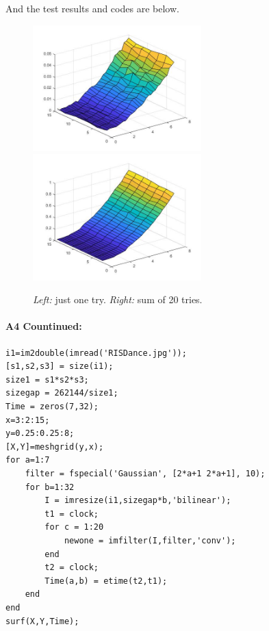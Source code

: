 	And the test results and codes are below.

	\begin{figure}[h]
    \centering
    \includegraphics[width=6.5cm]{hw2_q4_graph1.jpg}
    \includegraphics[width=6.5cm]{hw2_q4_graph3_20try.jpg}
    \caption{\emph{Left:} just one try. \emph{Right:} sum of 20 tries.}
    \label{fig:result3}
\end{figure}


	
	
	
	
	
	\pagebreak
	\paragraph{A4 Countinued:}
\begin{lstlisting}[style=Matlab-editor]
i1=im2double(imread('RISDance.jpg'));
[s1,s2,s3] = size(i1);
size1 = s1*s2*s3; 
sizegap = 262144/size1; 
Time = zeros(7,32); 
x=3:2:15; 
y=0.25:0.25:8; 
[X,Y]=meshgrid(y,x);
for a=1:7
    filter = fspecial('Gaussian', [2*a+1 2*a+1], 10);
    for b=1:32
        I = imresize(i1,sizegap*b,'bilinear');
        t1 = clock;
        for c = 1:20
            newone = imfilter(I,filter,'conv');
        end
        t2 = clock;
        Time(a,b) = etime(t2,t1);
    end
end
surf(X,Y,Time);
\end{lstlisting}
	
	
